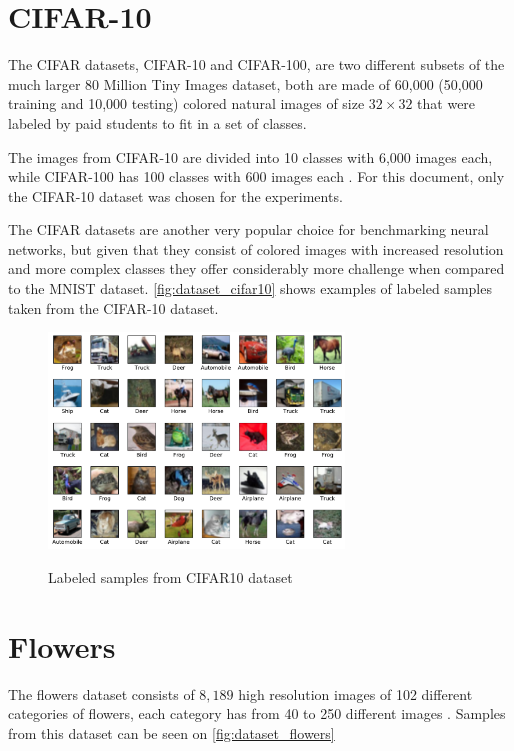 \section{CIFAR-10} \label{sec:cifar}
The \gls{CIFAR} datasets, \gls{CIFAR}-10 and \gls{CIFAR}-100, are two different subsets of the much larger 80 Million Tiny Images dataset, both are made of 60,000 (50,000 training and 10,000 testing) colored natural images of size $32{\times}32$ that were labeled by paid students to fit in a set of classes.

The images from \gls{CIFAR}-10 are divided into 10 classes with 6,000 images each, while \gls{CIFAR}-100 has 100 classes with 600 images each \cite{cifar2009}. For this document, only the \gls{CIFAR}-10 dataset was chosen for the experiments.

The \gls{CIFAR} datasets are another very popular choice for benchmarking neural networks, but given that they consist of colored images with increased resolution and more complex classes they offer considerably more challenge when compared to the \gls{MNIST} dataset. \autoref{fig:dataset_cifar10} shows examples of labeled samples taken from the \gls{CIFAR}-10 dataset.
\begin{figure}[hbt]
    \centering
    \caption{Labeled samples from CIFAR10 dataset}
    \includegraphics[width=0.7\textwidth]{chapters/Datasets/figures/CIFAR10.pdf}
    \label{fig:dataset_cifar10}
\end{figure}



\section{Flowers} \label{sec:flowers}
The flowers dataset consists of $8,189$ high resolution images of 102 different categories of flowers, each category has from 40 to 250 different images \cite{flowers2008}. Samples from this dataset can be seen on \autoref{fig:dataset_flowers}

